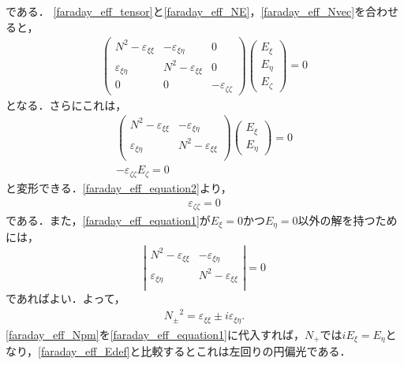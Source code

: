 である．
\eqref{faraday_eff_tensor}と\eqref{faraday_eff_NE}，\eqref{faraday_eff_Nvec}を合わせると，
\begin{align}
  \left(
  \begin{array}{ccc}
    N^2 - \varepsilon_{\xi\xi} &  - \varepsilon_{\xi\eta} & 0 \\
    \varepsilon_{\xi\eta} & N^2 - \varepsilon_{\xi\xi} & 0 \\
    0 & 0 &  - \varepsilon_{\zeta\zeta}
  \end{array}
  \right)
  \left(
  \begin{array}{c}
    E_\xi \\
    E_\eta\\
    E_\zeta
  \end{array}
  \right)
  =0
  \label{faraday_eff_equation}
\end{align}
となる．さらにこれは，
\begin{align}
  \left(
  \begin{array}{cc}
    N^2 - \varepsilon_{\xi\xi} &  - \varepsilon_{\xi\eta} \\
    \varepsilon_{\xi\eta} & N^2 - \varepsilon_{\xi\xi} \\
  \end{array}
  \right)
  \left(
  \begin{array}{c}
    E_\xi \\
    E_\eta
  \end{array}
  \right)
  =0
  \label{faraday_eff_equation1}\\
  - \varepsilon_{\zeta\zeta}E_{\zeta}=0 \label{faraday_eff_equation2}
\end{align}
と変形できる．\eqref{faraday_eff_equation2}より，
\begin{align}
  \varepsilon_{\zeta\zeta}=0
\end{align}
である．また，\eqref{faraday_eff_equation1}が$E_\xi=0$かつ$E_\eta=0$以外の解を持つためには，
\[
\left|
\begin{array}{cc}
  N^2 - \varepsilon_{\xi\xi} &  - \varepsilon_{\xi\eta} \\
  \varepsilon_{\xi\eta} & N^2 - \varepsilon_{\xi\xi} \\
\end{array}
\right|
=0
\]
であればよい．よって，
\begin{align}
  {N_\pm}^2=\varepsilon_{\xi\xi}\pm i\varepsilon_{\xi\eta} . \label{faraday_eff_Npm}
\end{align}
\eqref{faraday_eff_Npm}を\eqref{faraday_eff_equation1}に代入すれば，$N_+$では$iE_\xi=E_\eta$となり，\eqref{faraday_eff_Edef}と比較するとこれは左回りの円偏光である．
